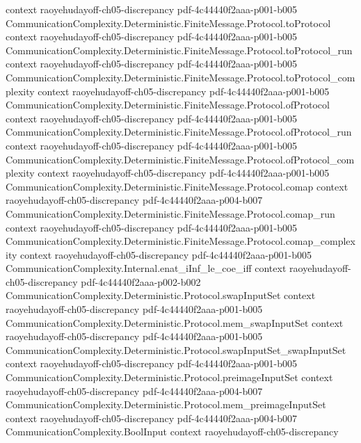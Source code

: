 \begin{lemma}
  {context}
  {raoyehudayoff-ch05-discrepancy}
  {pdf-4c44440f2aaa-p001-b005}
\proofstep
  {CommunicationComplexity.Deterministic.FiniteMessage.Protocol.toProtocol}
  {context}
  {raoyehudayoff-ch05-discrepancy}
  {pdf-4c44440f2aaa-p001-b005}
\proofstep
  {CommunicationComplexity.Deterministic.FiniteMessage.Protocol.toProtocol_run}
  {context}
  {raoyehudayoff-ch05-discrepancy}
  {pdf-4c44440f2aaa-p001-b005}
\proofstep
  {CommunicationComplexity.Deterministic.FiniteMessage.Protocol.toProtocol_complexity}
  {context}
  {raoyehudayoff-ch05-discrepancy}
  {pdf-4c44440f2aaa-p001-b005}
\proofstep
  {CommunicationComplexity.Deterministic.FiniteMessage.Protocol.ofProtocol}
  {context}
  {raoyehudayoff-ch05-discrepancy}
  {pdf-4c44440f2aaa-p001-b005}
\proofstep
  {CommunicationComplexity.Deterministic.FiniteMessage.Protocol.ofProtocol_run}
  {context}
  {raoyehudayoff-ch05-discrepancy}
  {pdf-4c44440f2aaa-p001-b005}
\proofstep
  {CommunicationComplexity.Deterministic.FiniteMessage.Protocol.ofProtocol_complexity}
  {context}
  {raoyehudayoff-ch05-discrepancy}
  {pdf-4c44440f2aaa-p001-b005}
\proofstep
  {CommunicationComplexity.Deterministic.FiniteMessage.Protocol.comap}
  {context}
  {raoyehudayoff-ch05-discrepancy}
  {pdf-4c44440f2aaa-p004-b007}
\proofstep
  {CommunicationComplexity.Deterministic.FiniteMessage.Protocol.comap_run}
  {context}
  {raoyehudayoff-ch05-discrepancy}
  {pdf-4c44440f2aaa-p001-b005}
\proofstep
  {CommunicationComplexity.Deterministic.FiniteMessage.Protocol.comap_complexity}
  {context}
  {raoyehudayoff-ch05-discrepancy}
  {pdf-4c44440f2aaa-p001-b005}
\proofstep
  {CommunicationComplexity.Internal.enat_iInf_le_coe_iff}
  {context}
  {raoyehudayoff-ch05-discrepancy}
  {pdf-4c44440f2aaa-p002-b002}
\proofstep
  {CommunicationComplexity.Deterministic.Protocol.swapInputSet}
  {context}
  {raoyehudayoff-ch05-discrepancy}
  {pdf-4c44440f2aaa-p001-b005}
\proofstep
  {CommunicationComplexity.Deterministic.Protocol.mem_swapInputSet}
  {context}
  {raoyehudayoff-ch05-discrepancy}
  {pdf-4c44440f2aaa-p001-b005}
\proofstep
  {CommunicationComplexity.Deterministic.Protocol.swapInputSet_swapInputSet}
  {context}
  {raoyehudayoff-ch05-discrepancy}
  {pdf-4c44440f2aaa-p001-b005}
\proofstep
  {CommunicationComplexity.Deterministic.Protocol.preimageInputSet}
  {context}
  {raoyehudayoff-ch05-discrepancy}
  {pdf-4c44440f2aaa-p004-b007}
\proofstep
  {CommunicationComplexity.Deterministic.Protocol.mem_preimageInputSet}
  {context}
  {raoyehudayoff-ch05-discrepancy}
  {pdf-4c44440f2aaa-p004-b007}
\proofstep
  {CommunicationComplexity.BoolInput}
  {context}
  {raoyehudayoff-ch05-discrepancy}

\end{lemma}
